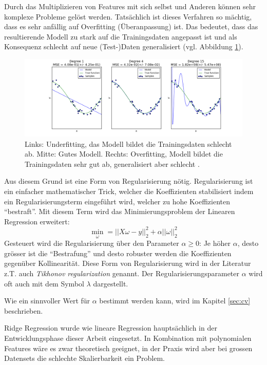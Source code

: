 \documentclass[10pt, a4paper]{article}
\begin{document}
Durch das Multiplizieren von Features mit sich selbst und Anderen können sehr komplexe Probleme gelöst werden. Tatsächlich ist dieses Verfahren so mäch\-tig, dass es sehr anfällig auf Overfitting (Überanpassung) ist. Das bedeutet, dass das resultierende Modell zu stark auf die Trainingsdaten angepasst ist und als Konsequenz schlecht auf neue (Test-)Daten generalisiert (vgl. Abbildung \ref{fig:under_and_overfitting}).

\begin{figure}[h]
	\centering
	\includegraphics[width=1\linewidth]{resources/images/under_and_overfitting}
	\caption[Vergleich von Over- und Underfitting]{Links: Underfitting, das Modell bildet die Trainingsdaten schlecht ab. Mitte: Gutes Modell. Rechts: Overfitting, Modell bildet die Trainingsdaten sehr gut ab, generalisiert aber schlecht \cite{sklearnoverunderfitting}.}
	\label{fig:under_and_overfitting}
\end{figure}

Aus diesem Grund ist eine Form von Regularisierung nötig. Regularisierung ist ein einfacher mathematischer Trick, welcher die Koeffizienten stabilisiert indem ein Regularisierungsterm eingeführt wird, welcher zu hohe Koeffizienten ``bestraft''. Mit diesem Term wird das Minimierungsproblem der Linearen Regression erweitert:
\[
\min_{\omega} = ||X\omega - y||_2^2 + \alpha || \omega ||_2^2
\]
Gesteuert wird die Regularisierung über den Parameter \(\alpha \geq 0 \): Je höher \(\alpha\), desto grösser ist die ``Bestrafung'' und desto robuster werden die Koeffizienten gegenüber Kollinearität.
Diese Form von Regularisierung wird in der Literatur z.T. auch \emph{Tikhonov regularization} genannt. Der Regularisierungsparameter \(\alpha\) wird oft auch mit dem Symbol \(\lambda\) dargestellt.
\cite{ridgeregs4u, sklearnlinearmodel}

Wie ein sinnvoller Wert für \(\alpha\) bestimmt werden kann, wird im Kapitel \ref{sec:cv} beschrieben.

Ridge Regression wurde wie lineare Regression hauptsächlich in der Entwicklungsphase dieser Arbeit eingesetzt. In Kombination mit polynomialen Features wäre es zwar theoretisch geeignet, in der Praxis wird aber bei grossen Datensets die schlechte Skalierbarkeit ein Problem.
\end{document}
